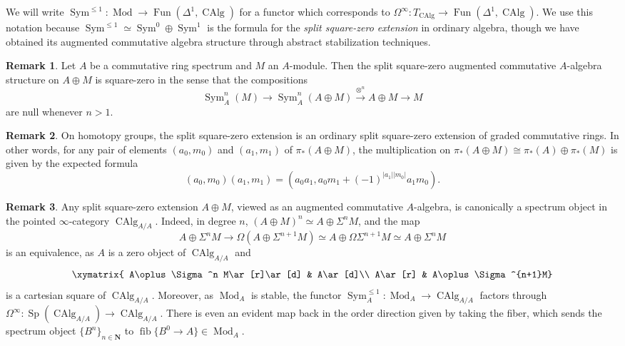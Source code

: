 \documentclass{article}
\theoremstyle{definition}
\newtheorem{remark}{Remark}[subsection]
\newcommand{\NN}{\mathbf{N}}
\newcommand{\too}{\longrightarrow}
\DeclareMathOperator{\Mod}{Mod}
\DeclareMathOperator{\CAlg}{CAlg}
\DeclareMathOperator{\Fun}{Fun}
\DeclareMathOperator{\Sym}{Sym}
\DeclareMathOperator{\fib}{fib}
\DeclareMathOperator{\Sp}{Sp}
\begin{document}
We will write $\Sym^{\leq 1}:\Mod\to\Fun(\Delta^1,\CAlg)$
\index{$\Sym^{\leq 1}$}
for a functor which corresponds to $\Omega^\infty:T_{\CAlg}\to\Fun(\Delta^1,\CAlg)$.
We use this notation because $\Sym^{\leq 1}\simeq\Sym^0\oplus\Sym^1$ is the formula for the {\em split square-zero extension} in ordinary algebra, though we have obtained its augmented commutative algebra structure through abstract stabilization techniques.
\begin{remark}
Let $A$ be a commutative ring spectrum and $M$ an $A$-module.
Then the split square-zero augmented commutative $A$-algebra structure on $A\oplus M$ is square-zero in the sense that the compositions
\[
\Sym^n_A(M)\too\Sym^n_A(A\oplus M)\overset{\otimes^n}{\too} A\oplus M\too M
\]
are null whenever $n>1$.
\end{remark}
\begin{remark}
On homotopy groups, the split square-zero extension is an ordinary split square-zero extension of graded commutative rings.
In other words, for any pair of elements $(a_0,m_0)$ and $(a_1,m_1)$ of $\pi_*(A\oplus M)$, the multiplication on $\pi_*(A\oplus M)\cong\pi_*(A)\oplus\pi_*(M)$ is given by the expected formula
\[
(a_0,m_0)(a_1,m_1)=(a_0a_1,a_0m_1+(-1)^{|a_1||m_0|}a_1m_0).
\]
\end{remark}

\begin{remark}
Any split square-zero extension $A\oplus M$, viewed as an augmented commutative $A$-algebra, is canonically a spectrum object in the pointed $\infty$-category $\CAlg_{A/A}$. Indeed, in degree $n$,
$(A\oplus M)^n\simeq A\oplus\Sigma^n M$, and the map
\[
A\oplus\Sigma^n M\too\Omega(A\oplus\Sigma^{n+1} M)\simeq A\oplus\Omega\Sigma^{n+1}M\simeq A\oplus\Sigma^n M
\]
is an equivalence, as $A$ is a zero object of $\CAlg_{A/A}$ and
\[
\xymatrix{
A\oplus\Sigma^n M\ar[r]\ar[d] & A\ar[d]\\
A\ar[r] & A\oplus\Sigma^{n+1}M}
\]
is a cartesian square of $\CAlg_{A/A}$.
Moreover, as $\Mod_A$ is stable, the functor $\Sym^{\leq 1}_A:\Mod_A\to\CAlg_{A/A}$ factors through $\Omega^\infty:\Sp(\CAlg_{A/A})\to\CAlg_{A/A}$.
There is even an evident map back in the order direction given by taking the fiber, which sends the spectrum object $\{B^n\}_{n\in\NN}$ to $\fib\{B^0\to A\}\in\Mod_A$.
\end{remark}
\end{document}
